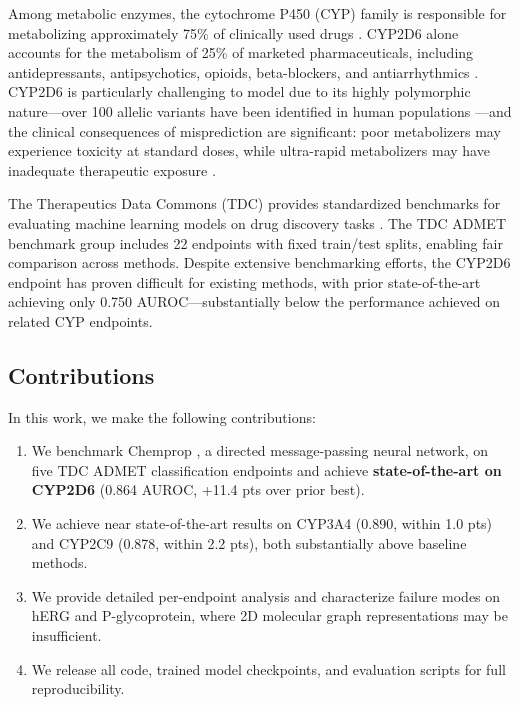 \documentclass[11pt]{article}
\begin{document}
Among metabolic enzymes, the cytochrome P450 (CYP) family is responsible for metabolizing approximately 75\% of clinically used drugs \citep{guengerich2008cytochrome}. CYP2D6 alone accounts for the metabolism of 25\% of marketed pharmaceuticals, including antidepressants, antipsychotics, opioids, beta-blockers, and antiarrhythmics \citep{zanger2013cytochrome}. CYP2D6 is particularly challenging to model due to its highly polymorphic nature---over 100 allelic variants have been identified in human populations \citep{gaedigk2017pharmacogene}---and the clinical consequences of misprediction are significant: poor metabolizers may experience toxicity at standard doses, while ultra-rapid metabolizers may have inadequate therapeutic exposure \citep{crews2014clinical}.

The Therapeutics Data Commons (TDC) provides standardized benchmarks for evaluating machine learning models on drug discovery tasks \citep{huang2021therapeutics}. The TDC ADMET benchmark group includes 22 endpoints with fixed train/test splits, enabling fair comparison across methods. Despite extensive benchmarking efforts, the CYP2D6 endpoint has proven difficult for existing methods, with prior state-of-the-art achieving only 0.750 AUROC---substantially below the performance achieved on related CYP endpoints.

\subsection{Contributions}

In this work, we make the following contributions:

\begin{enumerate}
    \item We benchmark Chemprop \citep{yang2019analyzing}, a directed message-passing neural network, on five TDC ADMET classification endpoints and achieve \textbf{state-of-the-art on CYP2D6} (0.864 AUROC, +11.4 pts over prior best).
    \item We achieve near state-of-the-art results on CYP3A4 (0.890, within 1.0 pts) and CYP2C9 (0.878, within 2.2 pts), both substantially above baseline methods.
    \item We provide detailed per-endpoint analysis and characterize failure modes on hERG and P-glycoprotein, where 2D molecular graph representations may be insufficient.
    \item We release all code, trained model checkpoints, and evaluation scripts for full reproducibility.
\end{enumerate}
\end{document}
